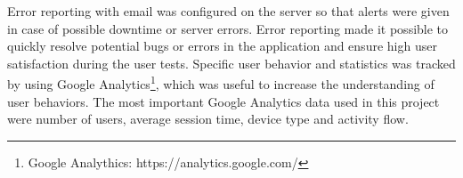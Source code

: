 Error reporting with email was configured on the server so that alerts were given in case of possible downtime or server errors. Error reporting made it possible to quickly resolve potential bugs or errors in the application and ensure high user satisfaction during the user tests. Specific user behavior and statistics was tracked by using Google Analytics\footnote{Google Analythics: https://analytics.google.com/}, which was useful to increase the understanding of user behaviors. The most important Google Analytics data used in this project were number of users, average session time, device type and activity flow.  

\cleardoublepage